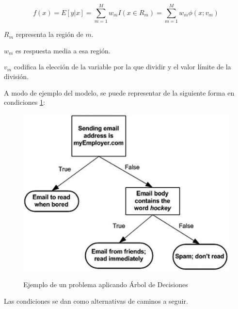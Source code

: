 \begin{Large}
	\begin{equation}
		f(x)=E[y|x]=\sum_{m=1}^{M}w_{m}I(x \in R_{m})=\sum_{m=1}^{M}w_{m}\phi(x;v_{m})
		\label{eq:Ecuación del Modelo Decision Tree}
	\end{equation}
\end{Large}
\par $R_{m}$ representa la región de $m$.
\par $w_{m}$ es respuesta media a esa región.
\par $v_{m}$ codifica la elección de la variable por la que dividir y el valor límite de la división.\\
\par A modo de ejemplo del modelo, se puede representar de la siguiente forma en condiciones \ref{fig:Problema aplicando Árbol de Decisiones}:\\

\begin{figure}[H]
	\centering
	\includegraphics[scale=1.2]{img/Marco Teorico/arbol de desicion.png} 
	\label{fig:Problema aplicando Árbol de Decisiones}
	\caption{Ejemplo de un problema aplicando Árbol de Decisiones}
\end{figure}
\par Las condiciones se dan como alternativas de caminos a seguir.\\

\doublespacing
